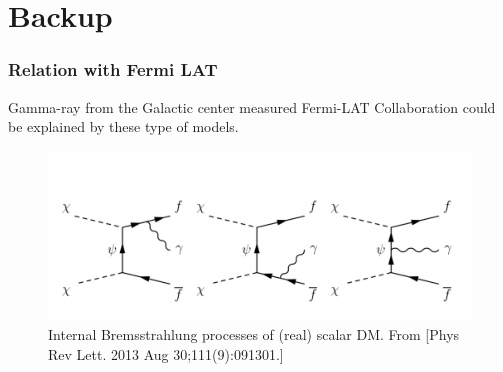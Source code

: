 \documentclass{beamer}
\begin{document}
\section{Backup}
\begin{frame}
\frametitle{Relation with Fermi LAT}

Gamma-ray from the Galactic center measured Fermi-LAT Collaboration could be explained by these type of models.

\begin{figure}
	\centering
	\includegraphics[scale=0.3]{pictures/Bremsstrahlung} 
	\caption{Internal Bremsstrahlung processes of (real) scalar DM. From [Phys Rev Lett. 2013 Aug 30;111(9):091301.] }
	\label{fig:Brem}
\end{figure}

\end{frame}
\end{document}
